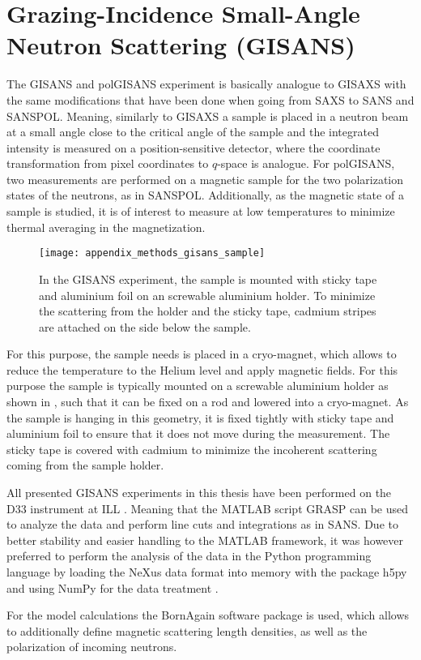 \documentclass[\main/dresen_thesis.tex]{subfiles}
\begin{document}
  \section{Grazing-Incidence Small-Angle Neutron Scattering (GISANS)}
    \label{app:methods:gisans}
    The GISANS and polGISANS experiment is basically analogue to GISAXS with the same modifications that have been done when going from SAXS to SANS and SANSPOL.
    Meaning, similarly to GISAXS a sample is placed in a neutron beam at a small angle close to the critical angle of the sample and the integrated intensity is measured on a position-sensitive detector, where the coordinate transformation from pixel coordinates to $q$-space is analogue.
    For polGISANS, two measurements are performed on a magnetic sample for the two polarization states of the neutrons, as in SANSPOL.
    Additionally, as the magnetic state of a sample is studied, it is of interest to measure at low temperatures to minimize thermal averaging in the magnetization.

    \begin{figure}[tb]
      \centering
      \texttt{[image: appendix\_methods\_gisans\_sample]}
      \caption{\label{fig:appendix:methods:saxs:samples}In the GISANS experiment, the sample is mounted with sticky tape and aluminium foil on an screwable aluminium holder. To minimize the scattering from the holder and the sticky tape, cadmium stripes are attached on the side below the sample.}
    \end{figure}

    For this purpose, the sample needs is placed in a cryo-magnet, which allows to reduce the temperature to the Helium level and apply magnetic fields.
    For this purpose the sample is typically mounted on a screwable aluminium holder as shown in , such that it can be fixed on a rod and lowered into a cryo-magnet.
    As the sample is hanging in this geometry, it is fixed tightly with sticky tape and aluminium foil to ensure that it does not move during the measurement.
    The sticky tape is covered with cadmium to minimize the incoherent scattering coming from the sample holder.

    All presented GISANS experiments in this thesis have been performed on the D33 instrument at ILL .
    Meaning that the MATLAB script GRASP can be used to analyze the data and perform line cuts and integrations as in SANS.
    Due to better stability and easier handling to the MATLAB framework, it was however preferred to perform the analysis of the data in the Python programming language by loading the NeXus data format into memory with the package h5py \cite{collette_2013_h5py} and using NumPy for the data treatment \cite{Oliphant_2006_Guide}.

    For the model calculations the BornAgain software package is used, which allows to additionally define magnetic scattering length densities, as well as the polarization of incoming neutrons.
\end{document}
